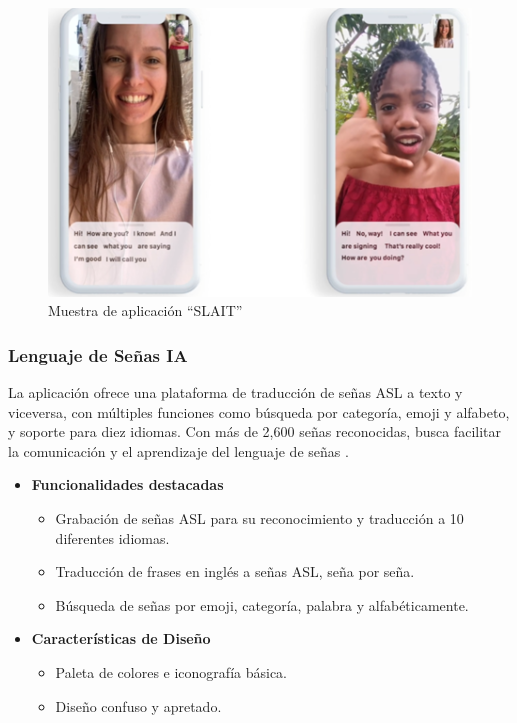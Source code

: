 \begin{figure} [H]
    \centering
    \includegraphics[width=0.5\linewidth]{figuras/slait.png}
    \caption{Muestra de aplicación “SLAIT”}
    \label{fig:enter-label}
\end{figure}

\subsubsection{Lenguaje de Señas IA}

La aplicación ofrece una plataforma de traducción de señas ASL a texto y viceversa, con múltiples funciones como búsqueda por categoría, emoji y alfabeto, y soporte para diez idiomas. Con más de 2,600 señas reconocidas, busca facilitar la comunicación y el aprendizaje del lenguaje de señas \cite{LenguajeDeSeñasIA}.

\begin{itemize}
    \item \textbf{Funcionalidades destacadas}
    \begin{itemize}
        \item Grabación de señas ASL para su reconocimiento y traducción a 10 diferentes idiomas.
        \item Traducción de frases en inglés a señas ASL, seña por seña.
        \item Búsqueda de señas por emoji, categoría, palabra y alfabéticamente.
    \end{itemize}

    \item \textbf{Características de Diseño}
    \begin{itemize}
        \item Paleta de colores e iconografía básica.
        \item Diseño confuso y apretado.
    \end{itemize}
\end{itemize}

